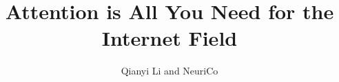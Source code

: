 \documentclass{article}
\title{Attention is All You Need for the Internet Field}
\author{Qianyi Li and NeuriCo}
\begin{document}
\maketitle

\begin{abstract}

\end{abstract}









\end{document}

